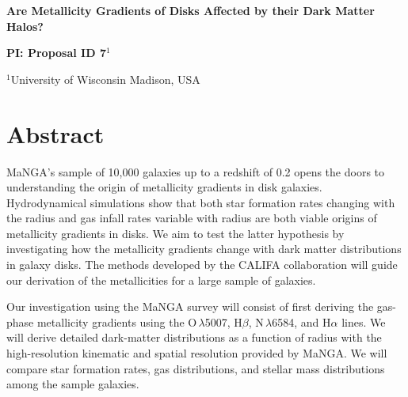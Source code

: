 \documentclass[11pt, a4paper, onecolumn]{article}
\begin{document}
\pagestyle{plain}
 

\begin{center} {\LARGE{\bf
{Are Metallicity Gradients of Disks Affected by their Dark Matter Halos?}
}} \end{center} \bigskip

\centerline{\bf PI:\@
{Proposal ID 7}$^1$}

\smallskip
$^1$University of Wisconsin Madison, USA
\smallskip

\section{Abstract}\label{sec:abstract}

    MaNGA's sample of 10,000 galaxies up to a redshift of 0.2 opens the doors
    to understanding the origin of metallicity gradients in disk galaxies.
    Hydrodynamical simulations show that both star formation rates changing
    with the radius and gas infall rates variable with radius are both viable
    origins of metallicity gradients in disks. We aim to test the latter
    hypothesis by investigating how the metallicity gradients change with dark
    matter distributions in galaxy disks.  The methods developed by the CALIFA
    collaboration \citep{sanchez14} will guide our derivation of the
    metallicities for a large sample of galaxies.   

    Our investigation using the MaNGA survey will consist of first deriving the
    gas-phase metallicity gradients using the O\iii\,$\lambda$5007, H$\beta$,
    N\ii\,$\lambda$6584, and H$\alpha$ lines.  We will derive detailed
    dark-matter distributions as a function of radius with the high-resolution
    kinematic and spatial resolution provided by MaNGA. We will compare star
    formation rates, gas distributions, and stellar mass distributions among
    the sample galaxies.
    
\end{document}
